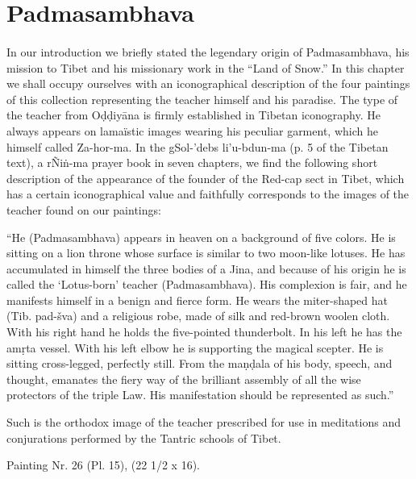 \documentclass[a4paper, 12pt, oneside]{article}
\begin{document}
\paragraph{}
\section{Padmasambhava}
\paragraph{}
In our introduction we briefly stated the legendary origin of Padmasambhava, his mission to Tibet and his missionary work in the ``Land of Snow.'' In this chapter we shall occupy ourselves with an iconographical description of the four paintings of this collection representing the teacher himself and his paradise. The type of the teacher from O\d{d}\d{d}iy\={a}na is firmly established in Tibetan iconography. He always appears on lamaïstic images wearing his peculiar garment, which he himself called Za-hor-ma. In the gSol-'debs li'u-bdun-ma (p. 5 of the Tibetan text), a rÑi\.{n}-ma prayer book in seven chapters, we find the following short description of the appearance of the founder of the Red-cap sect in Tibet, which has a certain iconographical value and faithfully corresponds to the images of the teacher found on our paintings:

``He (Padmasambhava) appears in heaven on a background of five colors. He is sitting on a lion throne whose surface is similar to two moon-like lotuses. He has accumulated in himself the three bodies of a Jina, and because of his origin he is called the `Lotus-born' teacher (Padmasambhava). His complexion is fair, and he manifests himself in a benign and fierce form. He wears the miter-shaped hat (Tib. pad-šva) and a religious robe, made of silk and red-brown woolen cloth. With his right hand he holds the five-pointed thunderbolt. In his left he has the am\d{r}ta vessel. With his left elbow he is supporting the magical scepter. He is sitting cross-legged, perfectly still. From the ma\d{n}\d{d}ala of his body, speech, and thought, emanates the fiery way of the brilliant assembly of all the wise protectors of the triple Law. His manifestation should be represented as such.''

Such is the orthodox image of the teacher prescribed for use in meditations and conjurations performed by the Tantric schools of Tibet.

\bigskip

Painting Nr. 26 (Pl. 15), (22 1/2 x 16).
\end{document}
